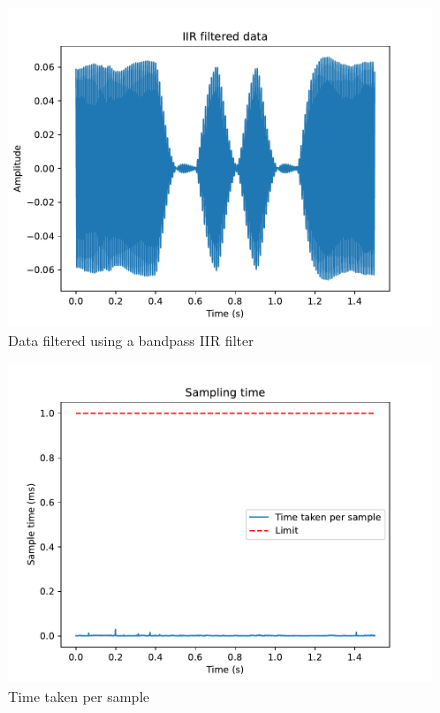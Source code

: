 \documentclass{article}
\begin{document}
\begin{multicols}{2}
\begin{figure}[H]
    \includegraphics[width=\linewidth]{figures/filtered.pdf}
    \caption{Data filtered using a bandpass IIR filter}
    \label{fig:filtered}
\end{figure}

\begin{figure}[H]
    \includegraphics[width=\linewidth]{figures/sampling.pdf}
    \caption{Time taken per sample}
    \label{fig:sampling}
\end{figure}


\end{multicols}
\end{document}
